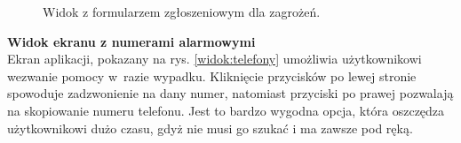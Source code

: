 \begin{figure}[H]

    \caption{Widok z formularzem zgłoszeniowym dla zagrożeń.}
    \label{widok:zgłoszenie}
\end{figure}

\noindent
\textbf{Widok ekranu z numerami alarmowymi} \\
\indent Ekran aplikacji, pokazany na rys. \ref{widok:telefony} umożliwia użytkownikowi wezwanie pomocy w~razie wypadku. Kliknięcie przycisków po lewej stronie spowoduje zadzwonienie na dany numer, natomiast przyciski po prawej pozwalają na skopiowanie numeru telefonu. Jest to bardzo wygodna opcja, która oszczędza użytkownikowi dużo czasu, gdyż nie musi go szukać i ma zawsze pod ręką.


